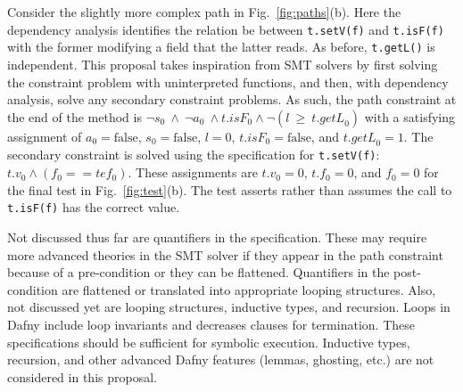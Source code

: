 \documentclass[11pt,onecolumn,notitlepage]{article}
\newcommand{\figref}[1]{Fig.~\ref{#1}}
\begin{document}
Consider the slightly more complex path in \figref{fig:paths}(b). Here the dependency analysis identifies the relation be between \texttt{t.setV(f)} and \texttt{t.isF(f)} with the former modifying a field that the latter reads. As before, \texttt{t.getL()} is independent. This proposal takes inspiration from SMT solvers by first solving the constraint problem with uninterpreted functions, and then, with dependency analysis, solve any secondary constraint problems. As such, the path constraint at the end of the method is $\neg s_0\ \wedge\ \neg a_0\ \wedge \mathit{t.isF}_0 \wedge \neg(l\ \ge\ \mathit{t.getL}_0)$ with a satisfying assignment of $a_0 = \mathrm{false}$, $s_0 = \mathrm{false}$, $\mathit{l} = 0$, $\mathit{t.isF}_0 = \mathrm{false}$, and $\mathit{t.getL}_0 = 1$. The secondary constraint is solved using the specification for \texttt{t.setV(f)}: $t.v_0 \wedge (f_0 == tef_0)$. These assignments are $t.v_0 = 0$, $t.f_0 = 0$, and $f_0 = 0$ for the final test in \figref{fig:test}(b). The test asserts rather than assumes the call to \texttt{t.isF(f)} has the correct value.

\begin{comment}
Symbolic execution must track side-effecting calls and introduce new uninterpreted functions as appropriate. For example, a second call to \texttt{T.isF(f : int)} should create a new uninterpreted function since its value might be different from the first call, and such information should be captured in the symbol table and path constraint as appropriate. Also note that it is possible to skip the secondary constraint problem with the flattened contracts to rather over-approximate actual program behavior using mocks. The mocks can be configured to return the needed sequence of program values to test the path. Depending on the code being tested, such an over-approximation may be sufficient for the test though there are two things to consider: first, what if such a path is not feasible in any real execution (i.e., there does not exist any input that would exercise that path); and second, what does a passing or failing test mean? Here it is not clear if such an over-approximation is sound and the question merits further investigation.
\end{comment}

Not discussed thus far are quantifiers in the specification. These may require more advanced theories in the SMT solver if they appear in the path constraint because of a pre-condition or they can be flattened. Quantifiers in the post-condition are flattened or translated into appropriate looping structures. Also, not discussed yet are looping structures, inductive types, and recursion. Loops in Dafny include loop invariants and decreases clauses for termination. These specifications should be sufficient for symbolic execution.  Inductive types, recursion, and other advanced Dafny features (lemmas, ghosting, etc.) are not considered in this proposal. 
\end{document}
